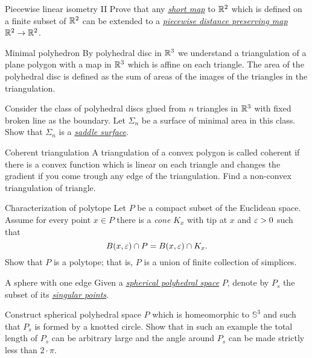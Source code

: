 \documentclass[twoside]{book}
\begin{document}
{\begin{pr}{\thm}{Piecewise linear isometry {\rm II}} \label{iso-kirzhbraun}
Prove that any \hyperref[Short map]{\emph{short map}} to $\mathbb{R}^2$ which is defined on a finite subset of $\mathbb{R}^2$ can be extended to a 
\hyperref[Piecewise distance preserving map]{\emph{piecewise distance preserving map}} 
$\mathbb{R}^2\to\mathbb{R}^2$.
\end{pr}


\begin{pr}{}{Minimal polyhedron}\label{Minimal polyhedron}
By polyhedral disc in $\mathbb{R}^3$
we understand a triangulation of a plane polygon with a map in $\mathbb{R}^3$ which is affine on each triangle.
The area of the polyhedral disc is defined as the sum of areas of the images of the triangles in the triangulation.

Consider the  class of polyhedral discs glued from $n$ triangles in $\mathbb{R}^3$ 
with fixed broken line as the boundary.
Let $\Sigma_n$ be a surface of minimal area in this class.
Show that $\Sigma_n$ is a \hyperref[Saddle surface]{\emph{saddle surface}}.
\end{pr}


\begin{pr}{}{Coherent triangulation}\label{Coherent triangulation} 
A triangulation of a convex polygon is called coherent if there is a convex function which is linear on each triangle and changes the gradient if you come trough any edge of the triangulation.
Find a non-convex triangulation of triangle.
\end{pr}

\begin{pr}{\thm}{Characterization of polytope}
\label{conic neighborhoods}
Let $P$ be a compact subset of the Euclidean space.
Assume for every point $x\in P$
there is a \emph{cone} $K_x$ with tip at $x$ and $\varepsilon>0$
such that 
$$B(x,\varepsilon)\cap P
=
B(x,\varepsilon)\cap K_x.$$
Show that $P$ is a polytope; 
that is, $P$ is a union of finite collection of simplices.
\end{pr}

\begin{pr}{\hard}{A sphere with one edge}\label{panov-S^3} 
Given  a \hyperref[Polyhedral space]{\emph{spherical polyhedral space}} $P$,
denote by $P_s$ the subset of its 
\hyperref[Polyhedral space]{\emph{singular points}}.

Construct spherical polyhedral space $P$ which is homeomorphic to $\mathbb{S}^3$ and such that $P_s$ is formed by a knotted circle.
Show that in such an example the total length of $P_s$ can be arbitrary large and the angle around $P_s$ can be made strictly less than $2\cdot\pi$.
\end{pr}

}
\end{document}
